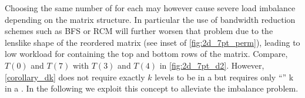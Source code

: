 Choosing the same number of \levels for each \levelGroup may
however cause severe load imbalance depending on the matrix structure. In
particular the use of bandwidth reduction schemes such as BFS or RCM
will further worsen that problem due to the lenslike shape of the
reordered matrix (see inset of \cref{fig:2d_7pt_perm}), leading to low
workload for \levelGroups containing the top and bottom rows of the
  matrix. Compare, \eg $T(0)$ and $T(7)$ with $T(3)$ and $T(4)$ in
\cref{fig:2d_7pt_d2}. However, \cref{corollary_dk} does not require
exactly $k$ levels to be in a \levelGroup but  
requires only ``\atleast'' k \levels in a \levelGroup. In
the following we exploit this concept to alleviate the imbalance
problem.
  
